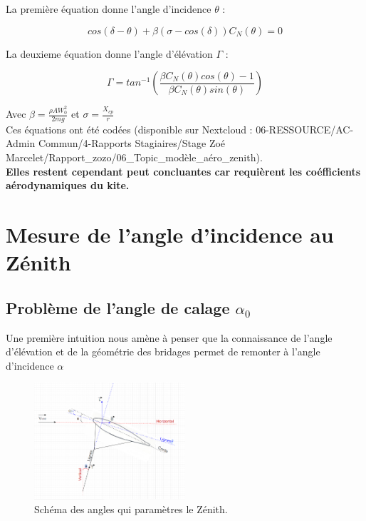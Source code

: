 \documentclass[conference]{IEEEtran}
\begin{document}
La première équation donne l’angle d’incidence $\theta$ : 
\begin{center}
    \begin{equation}
        cos(\delta - \theta) + \beta (\sigma-cos(\delta))C_N(\theta) = 0
        \label{eq:theta}
    \end{equation}
\end{center}
La deuxieme équation donne l’angle d’élévation $\Gamma$ :
\begin{center}
    \begin{equation}
        \Gamma = tan^{-1}(\frac{\beta C_N (\theta) cos(\theta)-1}{\beta C_N (\theta)sin(\theta)})
        \label{eq:gamma}
    \end{equation}
\end{center}
Avec $\beta = \frac{\rho A W_0^2}{2mg}$ et $\sigma = \frac{X_{cp}}{r}$ \\

Ces équations ont été codées (disponible sur Nextcloud : 06-RESSOURCE/AC-Admin Commun/4-Rapports Stagiaires/Stage Zoé Marcelet/Rapport\_zozo/06\_Topic\_modèle\_aéro\_zenith). \\
\textbf{Elles restent cependant peut concluantes car requièrent les coéfficients aérodynamiques du kite. }

\IEEEpeerreviewmaketitle
\section{Mesure de l'angle d'incidence au Zénith}

\subsection{Problème de l'angle de calage $\alpha_0$} 


Une première intuition nous amène à penser que la connaissance de l'angle d'élévation et de la géométrie des bridages permet de remonter à l'angle d'incidence $\alpha$

\begin{figure}[H]
    \centering
    \includegraphics[width=0.5\textwidth]{Pics/Schéma Equilibre Zéntih.png}  
    \caption{Schéma des angles qui paramètres le Zénith.}
    \label{fig:Zénith alpha zéro}
\end{figure}
\end{document}
